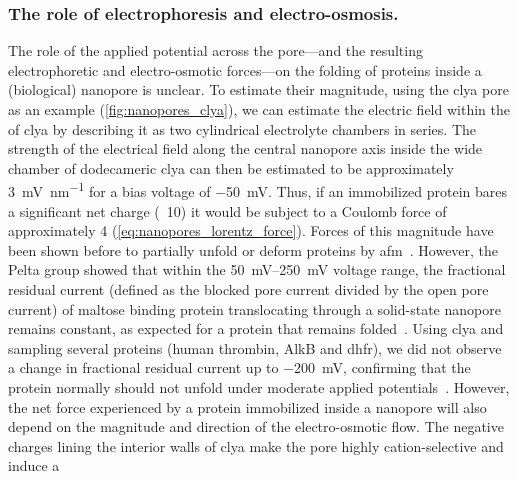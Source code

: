 \subsubsection{The role of electrophoresis and electro-osmosis.}
%

The role of the applied potential across the pore---and the resulting electrophoretic and electro-osmotic
forces---on the folding of proteins inside a (biological) nanopore is unclear. To estimate their magnitude,
using the \gls{clya} pore as an example (\cref{fig:nanopores_clya}), we can estimate the electric field within
the \lumen{} of \gls{clya} by describing it as two cylindrical electrolyte chambers in series. The strength of
the electrical field along the central nanopore axis inside the wide \cisi{} chamber of dodecameric \gls{clya}
can then be estimated to be approximately \SI{3}{\mV\per\nm} for a bias voltage of
\SI{-50}{\mV}.\footnotemark%
%
%
Thus, if an immobilized protein bares a significant net charge (\eg~\SI{10}{\ec}) it would be subject to a
Coulomb force of approximately \SI{4}{\pN} (\cref{eq:nanopores_lorentz_force}). Forces of this magnitude have
been shown before to partially unfold or deform proteins by \gls{afm}~\cite{Best-2001}. However, the Pelta
group showed that within the \SIrange{50}{250}{\mV} voltage range, the fractional residual current (defined as
the blocked pore current divided by the open pore current) of maltose binding protein translocating through a
solid-state nanopore remains constant, as expected for a protein that remains folded~\cite{Talaga-2009}. Using
\gls{clya} and sampling several proteins (human thrombin, {AlkB} and \gls{dhfr}), we did not observe a change
in fractional residual current up to \SI{-200}{\mV}, confirming that the protein normally should not unfold
under moderate applied potentials~\cite{Soskine-2013}. However, the net force experienced by a protein
immobilized inside a nanopore will also depend on the magnitude and direction of the electro-osmotic flow. The
negative charges lining the interior walls of \gls{clya} make the pore highly cation-selective and induce a
